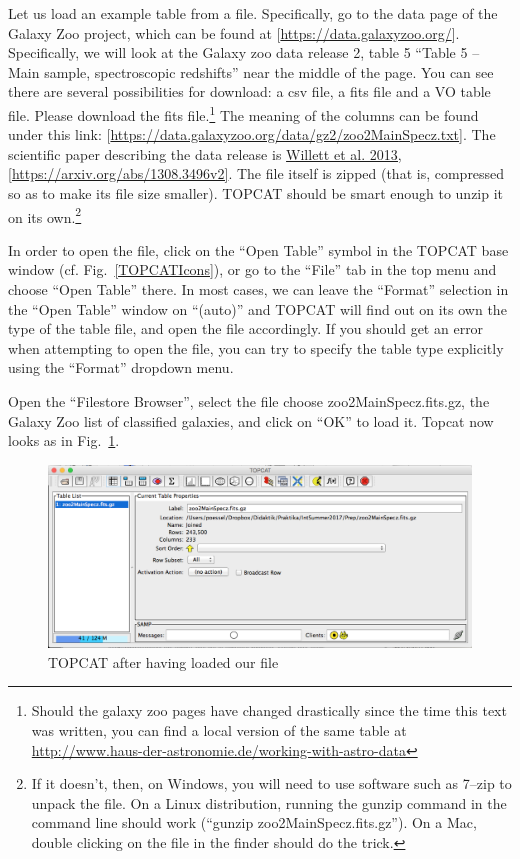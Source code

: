 \documentclass[twocolumn,apj]{openjournal}
\begin{document}
Let us load an example table from a file. Specifically, go to the data page of the Galaxy Zoo project, which can be found at [\href{https://data.galaxyzoo.org/}{https://data.galaxyzoo.org/}]. Specifically, we will look at the Galaxy zoo data release 2, table 5 ``Table 5 -- Main sample, spectroscopic redshifts'' near the middle of the page. You can see there are several possibilities for download: a csv file, a fits file and a VO table file. Please download the fits file.\footnote{Should the galaxy zoo pages have changed drastically since the time this text was written, you can find a local version of the same table at \href{http://www.haus-der-astronomie.de/working-with-astro-data}{http://www.haus-der-astronomie.de/working-with-astro-data} } The meaning of the columns can be found under this link: [\href{https://data.galaxyzoo.org/data/gz2/zoo2MainSpecz.txt}{https://data.galaxyzoo.org/data/gz2/zoo2MainSpecz.txt}]. The scientific paper describing the data release is \href{https://arxiv.org/abs/1308.3496v2}{Willett et al. 2013, [https://arxiv.org/abs/1308.3496v2]}.  The file itself is zipped (that is, compressed so as to make its file size smaller). TOPCAT should be smart enough to unzip it on its own.\footnote{If it doesn't, then, on Windows, you will need to use software such as 7--zip to unpack the file. On a Linux distribution, running the gunzip command in the command line should work (``gunzip zoo2MainSpecz.fits.gz''). On a Mac, double clicking on the file in the finder should do the trick.}

In order to open the file, click on the ``Open Table'' symbol
in the TOPCAT base window (cf. Fig.~\ref{TOPCATIcons}), or go to the ``File'' tab in the top menu and choose ``Open Table'' there. In most cases, we can leave the ``Format'' selection in the ``Open Table'' window on ``(auto)'' and TOPCAT will find out on its own the type of the table file, and open the file accordingly. If you should get an error when attempting to open the file, you can try to specify the table type explicitly using the ``Format'' dropdown menu. 

Open the ``Filestore Browser'', select the file choose zoo2MainSpecz.fits.gz, the Galaxy Zoo list of classified galaxies, and click on ``OK'' to load it. Topcat now looks as in Fig.~\ref{TOPCATloaded}.
\begin{figure}[htbp]
\begin{center}
\includegraphics[width=\linewidth]{topcat-loaded.png}
\caption{TOPCAT after having loaded our file}
\label{TOPCATloaded}
\end{center}
\end{figure}
\end{document}

